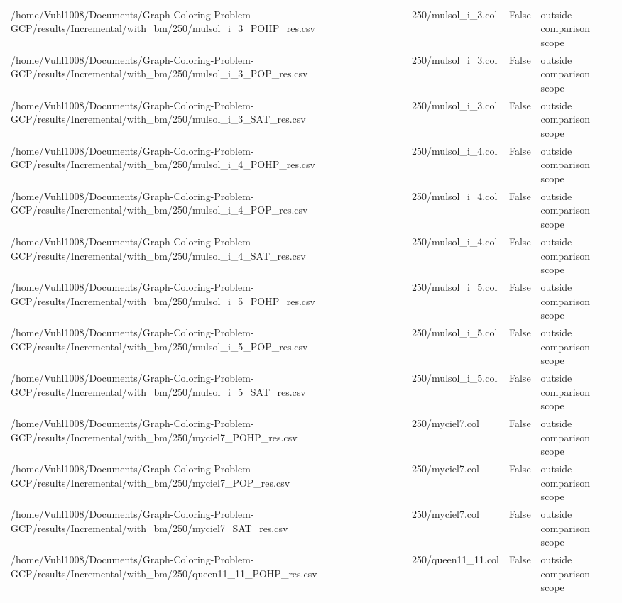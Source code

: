 \begin{table}[htbp]
\begin{tabular}{llll}
/home/Vuhl1008/Documents/Graph-Coloring-Problem-GCP/results/Incremental/with\_bm/250/mulsol\_i\_3\_POHP\_res.csv & 250/mulsol\_i\_3.col & False & outside comparison scope \\
/home/Vuhl1008/Documents/Graph-Coloring-Problem-GCP/results/Incremental/with\_bm/250/mulsol\_i\_3\_POP\_res.csv & 250/mulsol\_i\_3.col & False & outside comparison scope \\
/home/Vuhl1008/Documents/Graph-Coloring-Problem-GCP/results/Incremental/with\_bm/250/mulsol\_i\_3\_SAT\_res.csv & 250/mulsol\_i\_3.col & False & outside comparison scope \\
/home/Vuhl1008/Documents/Graph-Coloring-Problem-GCP/results/Incremental/with\_bm/250/mulsol\_i\_4\_POHP\_res.csv & 250/mulsol\_i\_4.col & False & outside comparison scope \\
/home/Vuhl1008/Documents/Graph-Coloring-Problem-GCP/results/Incremental/with\_bm/250/mulsol\_i\_4\_POP\_res.csv & 250/mulsol\_i\_4.col & False & outside comparison scope \\
/home/Vuhl1008/Documents/Graph-Coloring-Problem-GCP/results/Incremental/with\_bm/250/mulsol\_i\_4\_SAT\_res.csv & 250/mulsol\_i\_4.col & False & outside comparison scope \\
/home/Vuhl1008/Documents/Graph-Coloring-Problem-GCP/results/Incremental/with\_bm/250/mulsol\_i\_5\_POHP\_res.csv & 250/mulsol\_i\_5.col & False & outside comparison scope \\
/home/Vuhl1008/Documents/Graph-Coloring-Problem-GCP/results/Incremental/with\_bm/250/mulsol\_i\_5\_POP\_res.csv & 250/mulsol\_i\_5.col & False & outside comparison scope \\
/home/Vuhl1008/Documents/Graph-Coloring-Problem-GCP/results/Incremental/with\_bm/250/mulsol\_i\_5\_SAT\_res.csv & 250/mulsol\_i\_5.col & False & outside comparison scope \\
/home/Vuhl1008/Documents/Graph-Coloring-Problem-GCP/results/Incremental/with\_bm/250/myciel7\_POHP\_res.csv & 250/myciel7.col & False & outside comparison scope \\
/home/Vuhl1008/Documents/Graph-Coloring-Problem-GCP/results/Incremental/with\_bm/250/myciel7\_POP\_res.csv & 250/myciel7.col & False & outside comparison scope \\
/home/Vuhl1008/Documents/Graph-Coloring-Problem-GCP/results/Incremental/with\_bm/250/myciel7\_SAT\_res.csv & 250/myciel7.col & False & outside comparison scope \\
/home/Vuhl1008/Documents/Graph-Coloring-Problem-GCP/results/Incremental/with\_bm/250/queen11\_11\_POHP\_res.csv & 250/queen11\_11.col & False & outside comparison scope \\

\end{tabular}
\end{table}
